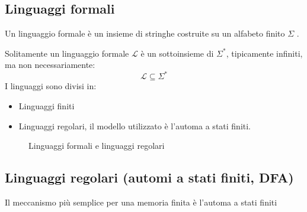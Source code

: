 \documentclass[a4paper]{article}
\begin{document}
\subsection{Linguaggi formali}
\begin{definition}
  Un linguaggio formale è un insieme di stringhe costruite su un alfabeto finito \( \Sigma  \) .
\end{definition}
Solitamente un linguaggio formale \( \mathcal{L} \) è un sottoinsieme di \( \Sigma^* \),
tipicamente infiniti, ma non necessariamente:
\[
  \mathcal{L} \subseteq \Sigma^*
\] 
I linguaggi sono divisi in:
\begin{itemize}
  \item Linguaggi finiti
  \item Linguaggi regolari, il modello utilizzato è l'automa a stati finiti.
\end{itemize}
\begin{figure}[H]
  \centering
  \caption{Linguaggi formali e linguaggi regolari}
\end{figure}

\subsection{Linguaggi regolari (automi a stati finiti, DFA)}
Il meccanismo più semplice per una memoria finita è l'automa a stati finiti
\end{document}
